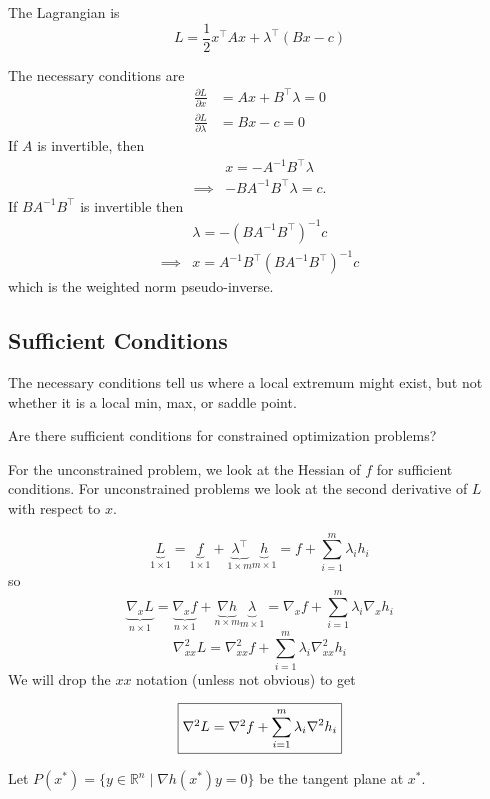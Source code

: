 \documentclass{article}
\begin{document}
	The Lagrangian is
	\[ 
		L = \frac{1}{2}x^\top Ax + \lambda^\top (Bx - c) 
	\]

	The necessary conditions are
	\begin{align*}
		\frac{\partial L}{\partial x} &= Ax + B^\top \lambda = 0 \\
		\frac{\partial L}{\partial \lambda} &= Bx - c = 0
	\end{align*}
	If $A$ is invertible, then
	\begin{align*}
		& x = -A^{-1}B^\top \lambda	\\
		\implies & -BA^{-1}B^\top \lambda = c.
	\end{align*}
	If $BA^{-1}B^\top$ is invertible then
	\begin{align*}
		& 	\lambda = -(BA^{-1}B^\top )^{-1}c \\
		\implies & x = A^{-1}B^\top (BA^{-1}B^\top )^{-1}c
	\end{align*}
	which is the weighted norm pseudo-inverse.	


\subsection{Sufficient Conditions}

	The necessary conditions tell us where a local extremum might exist, but not whether it is a local min, max, or saddle point.
	
	Are there sufficient conditions for constrained optimization problems?	

	For the unconstrained problem, we look at the Hessian of $f$ for sufficient conditions.  For unconstrained problems we look at the second derivative of $L$ with respect to $x$.
	
	
	\[ 
		\underbrace{L}_{1\times 1} = \underbrace{f}_{1\times 1} + \underbrace{\lambda^\top }_{1\times m}\underbrace{h}_{m\times 1} = f + \sum_{i=1}^m\lambda_i h_i 
	\]
	so
	\[ 
		\underbrace{\nabla_x L}_{n\times 1} = \underbrace{\nabla_xf}_{n\times 1} + \underbrace{\nabla h}_{n\times m}\underbrace{\lambda}_{m\times 1} = \nabla_xf + \sum_{i=1}^m\lambda_i\nabla_x h_i 
	\]
	\[ 
		\nabla_{xx}^2L = \nabla_{xx}^2f + \sum_{i=1}^m\lambda_i\nabla_{xx}^2 h_i  
	\]
	We will drop the $xx$ notation (unless not obvious) to get
	
	\[ 
		\fbox{$\nabla^2L = \nabla^2f + \displaystyle\sum_{i=1}^m\lambda_i\nabla^2h_i$}
	\]	

	Let $P(x^{\ast}) = \{ y\in \mathbb{R}^n \mid \nabla h(x^{\ast})y = 0 \}$ be the tangent plane at $x^{\ast}$.
\end{document}
